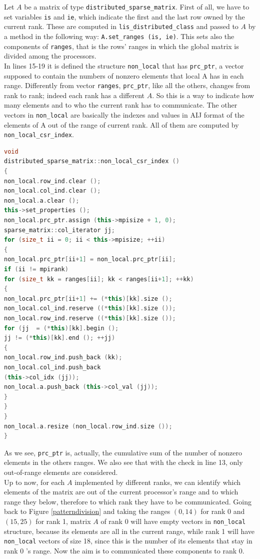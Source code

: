Let $ A $ be a matrix of type \texttt{distributed\_sparse\_matrix}. First of all, we have to set variables \texttt{is} and \texttt{ie}, which indicate the first and the last row owned by the current rank. These are computed in \texttt{lis\_distributed\_class} and passed to $ A $ by a method in the following way: \texttt{A.set\_ranges (is, ie)}. This sets also the components of \texttt{ranges}, that is the rows' ranges in which the global matrix is divided among the processors.\\
In lines 15-19 it is defined the structure \texttt{non\_local} that has \texttt{prc\_ptr}, a vector supposed to contain the numbers of nonzero elements that local A has in each range. Differently from vector \texttt{ranges}, \texttt{prc\_ptr}, like all the others, changes from rank to rank; indeed each rank has a different $ A $. So this is a way to indicate how many elements and to who the current rank has to communicate. The other vectors in \texttt{non\_local} are basically the indexes and values in AIJ format of the elements of A out of the range of current rank. All of them are computed by \texttt{non\_local\_csr\_index}. 
\begin{lstlisting}[language=C++, caption={distributed\_sparse\_matrix::non\_local\_csr\_index ()}]
void
distributed_sparse_matrix::non_local_csr_index ()
{
non_local.row_ind.clear ();
non_local.col_ind.clear ();
non_local.a.clear ();
this->set_properties ();
non_local.prc_ptr.assign (this->mpisize + 1, 0);
sparse_matrix::col_iterator jj;
for (size_t ii = 0; ii < this->mpisize; ++ii)
{
non_local.prc_ptr[ii+1] = non_local.prc_ptr[ii];
if (ii != mpirank)
for (size_t kk = ranges[ii]; kk < ranges[ii+1]; ++kk)
{
non_local.prc_ptr[ii+1] += (*this)[kk].size ();
non_local.col_ind.reserve ((*this)[kk].size ());
non_local.row_ind.reserve ((*this)[kk].size ());
for (jj  = (*this)[kk].begin ();
jj != (*this)[kk].end (); ++jj)
{
non_local.row_ind.push_back (kk);
non_local.col_ind.push_back 
(this->col_idx (jj));
non_local.a.push_back (this->col_val (jj));
}
}
}
non_local.a.resize (non_local.row_ind.size ());
}
\end{lstlisting}
As we see, \texttt{prc\_ptr} is, actually, the cumulative sum of the number of nonzero elements in the others ranges. We also see that with the check in line 13, only out-of-range elements are considered.\\
Up to now, for each $ A $ implemented by different ranks, we can identify which elements of the matrix are out of the current processor's range and to which range they below, therefore to which rank they have to be communicated. Going back to Figure \ref{patterndivision} and taking the ranges $ (0,14) $ for rank 0 and $ (15,25) $ for rank 1, matrix $ A $ of rank 0 will have empty vectors in \texttt{non\_local} structure, because its elements are all in the current range, while rank 1 will have \texttt{non\_local} vectors of size 18, since this is the number of its elements that stay in rank 0 's range. Now the aim is to communicated these components to rank 0.
